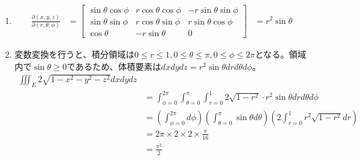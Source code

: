 \documentclass[dvipdfmx]{jsreport}
\begin{document}
\begin{souanswer}
\begin{enumerate}
\begin{align*}
    &= \int_{\theta= 0}^{2\pi}\int_{r= 0}^1 r^2(1+ 3\sin^2{theta})\cdot 2rdrd\theta\\
    &= \left(\int_{\theta= 0}^{2\pi} (1+ 3\sin^2{\theta})d\theta\right)\left(\int_{r= 0}^1 2r^3dr\right)\\
    &= \left([\theta]_{\theta= 0}^{2\pi}+ 3\pi\right)\left[\frac{r^4}{2}\right]_{r= 0}^1\\
    &= \frac{5\pi}{2}
\end{align*}
    \item 
\begin{align*}
    \frac{\partial (x, y, z)}{\partial (r, \theta, \phi)}
    &= 
\begin{bmatrix}
    \sin{\theta}\cos{\phi}& r\cos{\theta}\cos{\phi}& -r\sin{\theta}\sin{\phi}\\
    \sin{\theta}\sin{\phi}& r\cos{\theta}\sin{\phi}& r\sin{\theta}\cos{\phi}\\
    \cos{\theta}& -r\sin{\theta}& 0
\end{bmatrix}
    &= r^2\sin{\theta}
\end{align*}
    \item 変数変換を行うと、積分領域は$0\le r\le 1, 0\le \theta\le \pi, 0\le \phi\le 2\pi$となる。領域内で$\sin{\theta}\ge 0$であるため、体積要素は$dxdydz= r^2\sin{\theta}drd\theta d\phi$。
\begin{align*}
    \iiint_E 2\sqrt{1- x^2- y^2- z^2}dxdydz\\
    &= \int_{\phi= 0}^{2\pi}\int_{\theta= 0}^\pi\int_{r= 0}^1 2\sqrt{1- r^2}\cdot r^2\sin{\theta}drd\theta d\phi\\
    &= \left(\int_{\phi= 0}^{2\pi}d\phi\right)\left(\int_{\theta= 0}^\pi \sin{\theta}d\theta\right)\left(2\int_{r= 0}^1 r^2\sqrt{1- r^2}dr\right)\\
    &= 2\pi\times 2\times 2\times \frac{\pi}{16}\\
    &= \frac{\pi^2}{2}
\end{align*}
\end{enumerate}
\end{souanswer}
\end{document}
